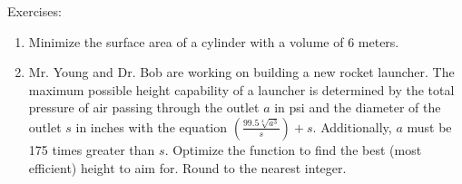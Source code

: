 \documentclass[../revisedmain.tex]{subfiles}
\begin{document}
	\begin{center}
		\LARGE Exercises:
	\end{center}
	\begin{enumerate}
		\item Minimize the surface area of a cylinder with a volume of 6 meters.
		\item Mr. Young and Dr. Bob are working on building a new rocket launcher. The maximum possible height capability of a launcher is determined by the total pressure of air passing through the outlet $a$ in psi and the diameter of the outlet $s$ in inches with the equation $\left(\displaystyle\frac{99.5\sqrt[4]{a^3}}{s}\right)+s$. Additionally, $a$ must be 175 times greater than $s$. Optimize the function to find the best (most efficient) height to aim for. Round to the nearest integer. 
	\end{enumerate}
\end{document}
